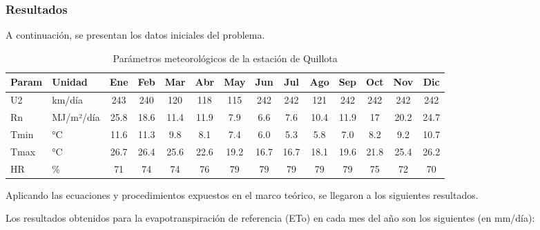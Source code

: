 \documentclass{article}  %
\begin{document}
\subsubsection{Resultados}

A continuación, se presentan los datos iniciales del problema.

\begin{table}[H]
  \centering
  \begin{tabular}{|l|l|c|c|c|c|c|c|c|c|c|c|c|c|}
  \hline
  \textbf{Param} & \textbf{Unidad} & \textbf{Ene} & \textbf{Feb} & \textbf{Mar} & \textbf{Abr} & \textbf{May} & \textbf{Jun} & \textbf{Jul} & \textbf{Ago} & \textbf{Sep} & \textbf{Oct} & \textbf{Nov} & \textbf{Dic} \\ \hline
  U2    & km/día       & 243 & 240 & 120 & 118 & 115 & 242 & 242 & 121 & 242 & 242 & 242 & 242 \\ \hline
  Rn    & MJ/m²/día    & 25.8 & 18.6 & 11.4 & 11.9 & 7.9 & 6.6 & 7.6 & 10.4 & 11.9 & 17 & 20.2 & 24.7 \\ \hline
  Tmin  & °C           & 11.6 & 11.3 & 9.8 & 8.1 & 7.4 & 6.0 & 5.3 & 5.8 & 7.0 & 8.2 & 9.2 & 10.7 \\ \hline
  Tmax  & °C           & 26.7 & 26.4 & 25.6 & 22.6 & 19.2 & 16.7 & 16.7 & 18.1 & 19.6 & 21.8 & 25.4 & 26.2 \\ \hline
  HR    & \%           & 71 & 74 & 74 & 76 & 79 & 79 & 79 & 79 & 79 & 75 & 72 & 70 \\ \hline
  \end{tabular}
  \caption{Parámetros meteorológicos de la estación de Quillota}
\end{table}

Aplicando las ecuaciones y procedimientos expuestos en el marco teórico, se llegaron a los siguientes resultados.

Los resultados obtenidos para la evapotranspiración de referencia (ETo) en cada mes del año son los siguientes (en mm/día):
\end{document}
